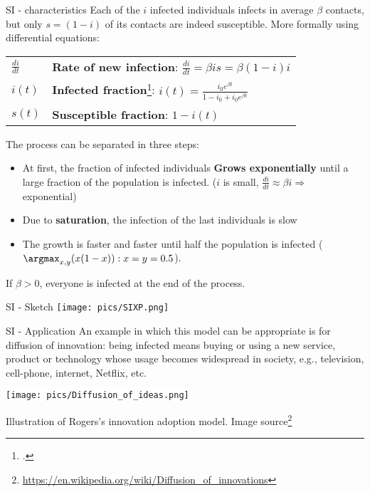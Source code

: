 \begin{textbox}{SI - characteristics}
    Each of the $i$ infected individuals infects in average $\beta$ contacts, but only $s=(1-i)$ of its contacts are indeed susceptible. More formally using differential equations:

    \begin{tabular}{p{}|p{}}\scriptsize

        $\frac{di}{dt}$ & \textbf{Rate of new infection}: $\frac{di}{dt}=\beta i s=\beta (1-i)i$                                       \\


        $i(t)$          & \textbf{Infected fraction}\footcite{barrat2008dynamical}: $i(t)=\frac{i_0e^{\beta t}}{1-i_0+i_0e^{\beta t}}$ \\
        $s(t)$          & \textbf{Susceptible fraction}: $1-i(t)$
    \end{tabular}
    The process can be separated in three steps:
    \begin{itemize}
        \item At first, the fraction of infected individuals \textbf{Grows exponentially} until a large fraction of the population is infected. ($i$ is small,  $\frac{di}{dt}\approx \beta i \Rightarrow$ exponential)
        \item Due to \textbf{saturation}, the infection of the last individuals is slow
        \item The growth is faster and faster until half the population is infected ($\argmax_ {x,y}(x(1-x)):x=y=0.5$).
    \end{itemize}

    If $\beta>0$, everyone is infected at the end of the process.
\end{textbox}


\begin{textbox}{SI - Sketch}
    \centering
    \texttt{[image: pics/SIXP.png]}
\end{textbox}


\begin{textbox}{SI - Application}
    An example in which this model can be appropriate is for diffusion of innovation: being infected means buying or using a new service, product or technology whose usage becomes widespread in society, e.g., television, cell-phone, internet, Netflix, etc.

    \centering
    \colorbox{white}{\texttt{[image: pics/Diffusion\_of\_ideas.png]}}

    Illustration of Rogers's innovation adoption model. Image source\footnote{\url{https://en.wikipedia.org/wiki/Diffusion_of_innovations}}
\end{textbox}



